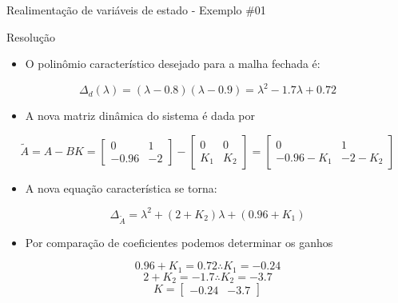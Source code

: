 \begin{frame}{Realimentação de variáveis de estado - Exemplo \#01}
\begin{block}{Resolução}
	\begin{itemize}
		\item O polinômio característico desejado para a malha fechada é:
	\end{itemize}
	$$\Delta_d(\lambda) = (\lambda-\num{0,8})(\lambda-\num{0,9}) = \lambda^2 - \num{1,7}\lambda + \num{0,72}$$
	\vspace{-0.3cm}
		\begin{itemize}
		\item A nova matriz dinâmica do sistema é dada por
	\end{itemize}
	$$ \tilde{A} = A - BK = \begin{bmatrix}
		0 & 1\\ 
		-\num{0,96} & -2
	\end{bmatrix} -
	\begin{bmatrix}
		0 & 0 \\ 
		K_1 & K_2 
	\end{bmatrix} =
	\begin{bmatrix}
		0 & 1\\ 
		-\num{0,96} - K_1 & -2 - K_2
	\end{bmatrix} $$
	\vspace{-0.2cm}
	\begin{itemize}
		\item A nova equação característica se torna:
	\end{itemize}
	$$ \Delta_{\tilde{A}} = \lambda^2 + (2 + K_2)\lambda + (\num{0,96} + K_1)$$
	\vspace{-0,3 cm}
	\begin{itemize}
		\item Por comparação de coeficientes podemos determinar os ganhos
	\end{itemize}
	$$ \num{0,96}+K_1 = \num{0,72} \therefore K_1 = -\num{0,24} $$
	$$ 2+K_2 = -\num{1,7} \therefore K_2 = -\num{3,7} $$
	$$K = \begin{bmatrix}
		-\num{0,24} & -\num{3,7}
	\end{bmatrix}$$
\end{block}
\end{frame}

